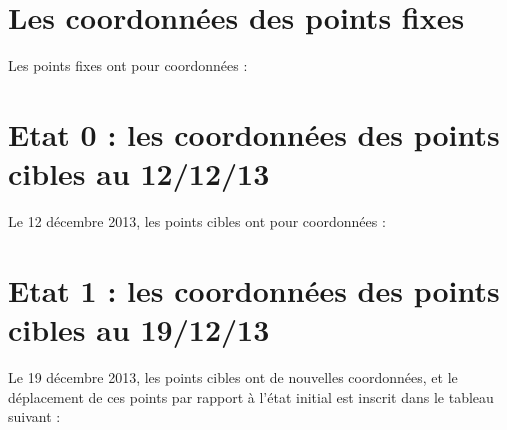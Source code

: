 
\section{Les coordonnées des points fixes}
Les points fixes ont pour coordonnées :

\newpage
\section{Etat 0 : les coordonnées des points cibles au 12/12/13}
Le 12 décembre 2013, les points cibles ont pour coordonnées :

\newpage

\section{Etat 1 : les coordonnées des points cibles au 19/12/13}
Le 19 décembre 2013, les points cibles ont de nouvelles coordonnées, et le déplacement de ces points par rapport à l'état initial est inscrit dans le tableau suivant :

\newpage 
